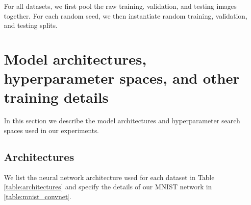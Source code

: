 \documentclass{article}
\begin{document}
For all datasets, we first pool the raw training, validation, and testing images together.
For each random seed, we then instantiate random training, validation, and testing splits.

\clearpage
\newpage
\section{Model architectures, hyperparameter spaces, and other training details}
\label{sec:architectures}

In this section we describe the model architectures and hyperparameter search spaces used in our experiments.

\subsection{Architectures}

We list the neural network architecture used for each dataset in Table \ref{table:architectures} and specify the details of our MNIST network in \ref{table:mnist_convnet}.
\end{document}
